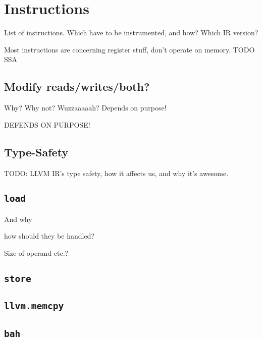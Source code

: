 \section {Instructions}

List of instructions. Which have to be instrumented, and how? Which IR version?

Most instructions are concerning register stuff, don't operate on memory. TODO
SSA

\subsection {Modify reads/writes/both?}

Why? Why not? Wuzzaaaaah?
Depends on purpose!

DEFENDS ON PURPOSE!

\subsection {Type-Safety}

TODO: LLVM IR's type safety, how it affects us, and why it's awesome.

\subsection {\texttt{load}}

And why

how should they be handled?

Size of operand etc.?

\subsection {\texttt{store}}

\subsection {\texttt{llvm.memcpy}}

\subsection {\texttt{bah}}

